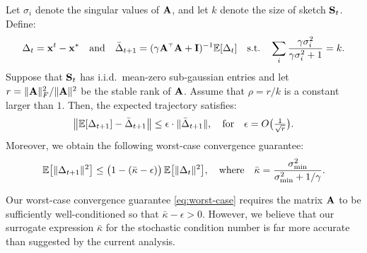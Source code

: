 \documentclass[thesis.tex]{subfiles}
\begin{document}
\begin{corollary}\label{c:kaczmarz2}
Let $\sigma_i$ denote the singular values of $\A$, and let $k$ denote
the size of sketch $\S_t$. Define:
\begin{align*}
\Delta_t=\x^t-\x^*\quad\text{and}\quad  \bar\Delta_{t+1} =
  (\gamma\A^\top\A+\I)^{-1}\E[\Delta_t]\quad\text{s.t.}\quad
  \sum_i\frac{\gamma\sigma_i^2}{\gamma\sigma_i^2+1}=k.
\end{align*}
  Suppose that $\S_t$ has i.i.d.~mean-zero sub-gaussian entries and let
  $r=\|\A\|_F^2/\|\A\|^2$ be the stable rank of $\A$. 
Assume that $\rho = r/k$ is a constant larger than $1$. Then, the
expected trajectory satisfies:
\begin{align}
  \big\|\E[\Delta_{t+1}] - \bar\Delta_{t+1}\big\|
  \leq \epsilon\cdot \|\bar\Delta_{t+1}\|,
  \quad\text{for}\quad\epsilon=O\big(\tfrac1{\sqrt
  r}\big).\label{eq:trajectory}
\end{align}
Moreover, we obtain the following worst-case convergence guarantee:
\begin{align}
  \E\big[\|\Delta_{t+1}\|^2\big]
  \leq \big(1-
  (\bar\kappa-\epsilon)\big)\,\E\big[\|\Delta_t\|^2\big],
  \quad\text{where}\quad
  \bar\kappa = \frac{\sigma_{\min}^2}{\sigma_{\min}^2+1/\gamma}.\label{eq:worst-case}
\end{align}
\end{corollary}
\begin{remark}
Our worst-case convergence guarantee \eqref{eq:worst-case}
  requires the matrix $\A$ to be sufficiently well-conditioned so
  that $\bar\kappa-\epsilon>0$. However, we believe that our surrogate expression
  $\bar\kappa$ for the stochastic condition number is far more
  accurate than suggested by the current analysis. 
\end{remark}
\end{document}
